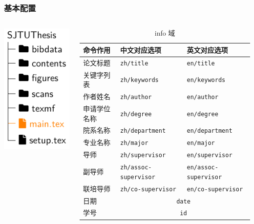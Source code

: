 \begin{frame}[label=setup]
  \frametitle{基本配置}
  \begin{columns}
    \begin{column}{0.35\textwidth}
      \includegraphics[page=4]{support/figures/thesisdir.pdf}
    \end{column}
    \begin{column}{0.65\textwidth}
      \begin{table}
        \centering
        \caption{info 域}
        \footnotesize
        \begin{tabular}{lll} \toprule
          命令作用     & 中文对应选项                      & 英文对应选项                 \\ \midrule
          论文标题     & \texttt{zh/title}                 & \texttt{en/title}            \\
          关键字列表   & \texttt{zh/keywords}              & \texttt{en/keywords}        \\
          作者姓名     & \texttt{zh/author}                & \texttt{en/author}           \\
          申请学位名称 & \texttt{zh/degree}                & \texttt{en/degree}           \\
          院系名称     & \texttt{zh/department}            & \texttt{en/department}       \\
          专业名称     & \texttt{zh/major}                 & \texttt{en/major}            \\
          导师         & \texttt{zh/supervisor}            & \texttt{en/supervisor}       \\
          副导师       & \texttt{zh/assoc-supervisor}      & \texttt{en/assoc-supervisor} \\
          联培导师     & \texttt{zh/co-supervisor}         & \texttt{en/co-supervisor}    \\
          日期         & \multicolumn{2}{c}{\texttt{date}}                                \\
          学号         & \multicolumn{2}{c}{\texttt{id}}                                  \\ \bottomrule
        \end{tabular}
      \end{table}
    \end{column}
  \end{columns}
\end{frame}

